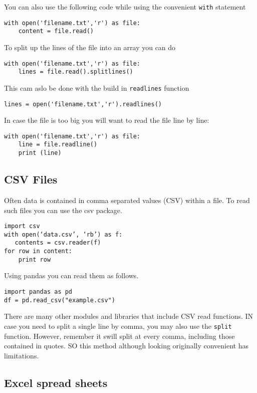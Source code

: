 You can also use the following code while using the convenient
\verb|with| statement

\begin{verbatim}
with open('filename.txt','r') as file:
    content = file.read()
\end{verbatim}

To split up the lines of the file into an array you can do

\begin{verbatim}
with open('filename.txt','r') as file:
    lines = file.read().splitlines()
\end{verbatim}


This cam aslo be done with the build in \verb|readlines| function
\begin{verbatim}
lines = open('filename.txt','r').readlines()
\end{verbatim}

In case the file is too big you will want to read the file line by
line:

\begin{verbatim}
with open('filename.txt','r') as file:
    line = file.readline()
    print (line)
\end{verbatim}


\subsection{CSV Files}

Often data is contained in comma separated values (CSV) within a
file. To read such files you can use the csv package.

\begin{verbatim}
import csv
with open(‘data.csv’, ‘rb’) as f:
   contents = csv.reader(f)
for row in content:
    print row
\end{verbatim}

Using pandas you can read them as follows.

\begin{verbatim}
import pandas as pd
df = pd.read_csv("example.csv") 
\end{verbatim}

There are many other modules and libraries that include CSV read
functions. IN case you need to split a single line by comma, you may
also use the \verb|split| function. However, remember it swill split
at every comma, including those contained in quotes. SO this method
although looking originally convenient has limitations.

\subsection{Excel spread sheets}

